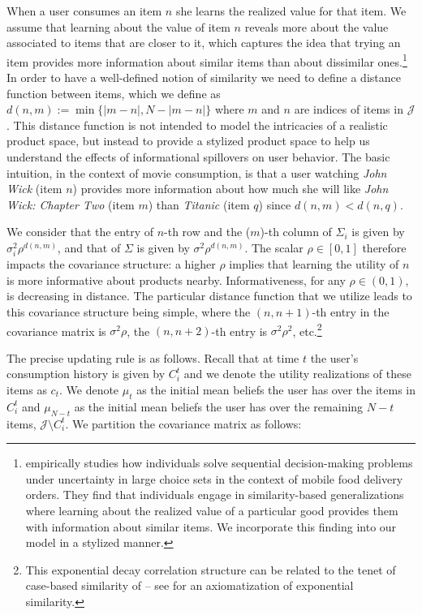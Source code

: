 \documentclass[manuscript]{acmart}
\newcommand{\xhdr}[1]{\vspace{1mm} \noindent{\bf #1}}
\begin{document}
\xhdr{User Learning}
When a user consumes an item $n$ she learns the realized value for that item. We assume that learning about the value of item $n$ reveals more about the value associated to items that are closer to it, which captures the idea that trying an item provides more information about similar items than about dissimilar ones.\footnote{\cite{schulz2019structured} empirically studies how individuals solve sequential decision-making problems under uncertainty in large choice sets in the context of mobile food delivery orders. They find that individuals engage in similarity-based generalizations where learning about the realized value of a particular good provides them with information about similar items. We incorporate this finding into our model in a stylized manner.} In order to have a well-defined notion of similarity we need to define a distance function between items, which we define as $d(n,m):=\min\{ \lvert m - n \rvert ,N - \lvert m - n \rvert \}$ where $m$ and $n$ are indices of items in $\mathcal{J}$. This distance function is not intended to model the intricacies of a realistic product space, but instead to provide a stylized product space to help us understand the effects of informational spillovers on user behavior. The basic intuition, in the context of movie consumption, is that a user watching \textit{John Wick} (item $n$) provides more information about how much she will like \textit{John Wick: Chapter Two} (item $m$) than \textit{Titanic} (item $q$) since $d(n, m) < d(n, q)$. 
\par
We consider that the entry of $n$-th row and the ($m$)-th column of $\Sigma_i$ is given by $\sigma_i^2 \rho^{d(n,m)}$, and that of $\Sigma$ is given by $\sigma^2 \rho^{d(n,m)}$. The scalar $\rho \in [0,1]$ therefore impacts the covariance structure: a higher $\rho$ implies that learning the utility of $n$ is more informative about products nearby. Informativeness, for any $\rho \in (0,1)$, is decreasing in distance. The particular distance function that we utilize leads to this covariance structure being simple, where the $(n,n+1)$-th entry in the covariance matrix is $\sigma^{2} \rho$, the $(n,n+2)$-th entry is $\sigma^{2} \rho^2$, etc.\footnote{This exponential decay correlation structure can be related to the tenet of case-based similarity of \cite{gilboa1995case} -- see \cite{billot2008axiomatization} for an axiomatization of exponential similarity.}
\par
The precise updating rule is as follows. Recall that at time $t$ the user's consumption history is given by $C_{i}^{t}$ and we denote the utility realizations of these items as $c_t$. We denote $\mu_t$ as the initial mean beliefs the user has over the items in $C_{i}^{t}$ and $\mu_{N-t}$ as the initial mean beliefs the user has over the remaining $N-t$ items, $\mathcal{J} \setminus C_{i}^{t}$. We partition the covariance matrix as follows:
\end{document}
